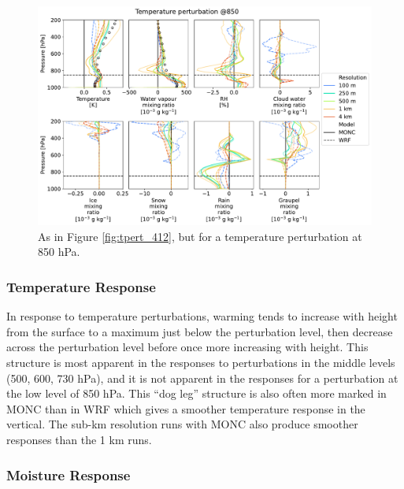 \documentclass[draft]{agujournal2019}
\begin{document}
\begin{figure}[pth]
    \noindent\includegraphics[width=\textwidth]{figures/pert_diffs_T_0.5_@850}
    \caption{As in Figure \ref{fig:tpert_412}, but for a temperature
    perturbation at 850 hPa.}
    \label{fig:tpert_850}
\end{figure}

\subsubsection{Temperature Response}

In response to temperature perturbations, warming tends to increase with height
from the surface to a maximum just below the perturbation level, then decrease
across the perturbation level before once more increasing with height. This
structure is most apparent in the responses to perturbations in the middle
levels (500, 600, 730 hPa), and it is not apparent in the responses for a
perturbation at the low level of 850 hPa. This ``dog leg'' structure is also
often more marked in MONC than in WRF which gives a smoother temperature
response in the vertical. The sub-km resolution runs with MONC also produce
smoother responses than the 1 km runs.

\subsubsection{Moisture Response}
\end{document}
